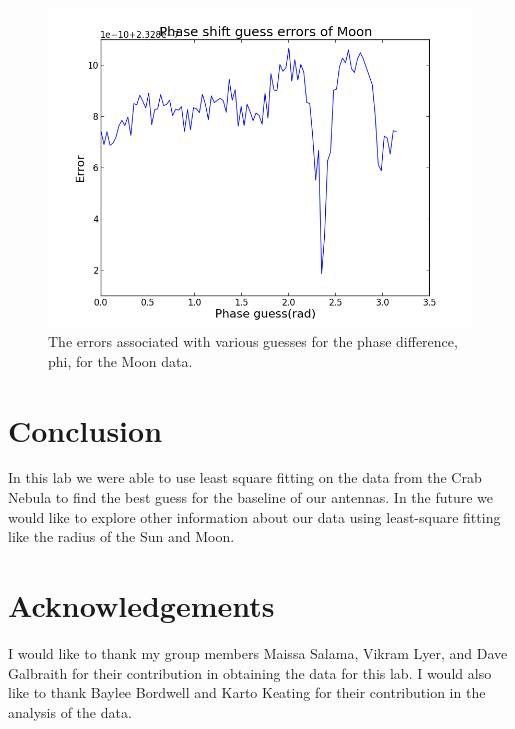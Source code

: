 \documentclass[12pt]{article}
\begin{document}
\begin {figure}[h!]
\centering
\includegraphics[scale = 0.5]
{errormoon.png}
\caption{\label{rvd} The errors associated with various guesses for the
  phase difference, phi, for the Moon data.}
\end {figure}




\section {Conclusion}
In this lab we were able to use least square fitting on the data from
the Crab Nebula to find the best guess for the baseline of our
antennas. In the future we would like to explore other information about
our data using least-square fitting like the radius of the Sun and
Moon. 

\section {Acknowledgements}
I would like to thank my group members Maissa Salama, Vikram Lyer, and
Dave Galbraith for their contribution in obtaining the data for this lab. I
would also like to thank Baylee Bordwell and Karto Keating for their
contribution in the analysis of the data. 
\end{document}
